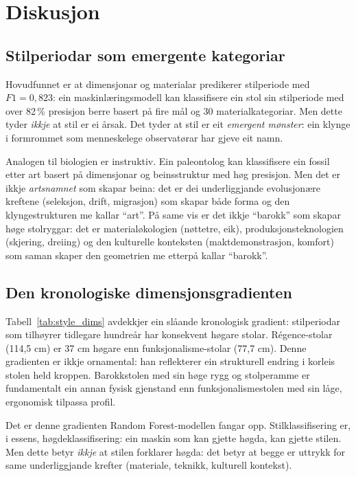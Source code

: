 \documentclass[10pt, a4paper, twocolumn]{article}
\begin{document}
\section{Diskusjon}

\subsection{Stilperiodar som emergente kategoriar}

Hovudfunnet er at dimensjonar og materialar predikerer stilperiode med $F1 = 0{,}823$: ein maskinlæringsmodell kan klassifisere ein stol sin stilperiode med over 82\,\% presisjon berre basert på fire mål og 30 materialkategoriar. Men dette tyder \emph{ikkje} at stil er ei årsak. Det tyder at stil er eit \emph{emergent mønster}: ein klynge i formrommet som menneskelege observatørar har gjeve eit namn.

Analogen til biologien er instruktiv. Ein paleontolog kan klassifisere ein fossil etter art basert på dimensjonar og beinsstruktur med høg presisjon. Men det er ikkje \emph{artsnamnet} som skapar beina: det er dei underliggjande evolusjonære kreftene (seleksjon, drift, migrasjon) som skapar både forma og den klyngestrukturen me kallar ``art''. På same vis er det ikkje ``barokk'' som skapar høge stolryggar: det er materialøkologien (nøttetre, eik), produksjonsteknologien (skjering, dreiing) og den kulturelle konteksten (maktdemonstrasjon, komfort) som saman skaper den geometrien me etterpå kallar ``barokk''.

\subsection{Den kronologiske dimensjonsgradienten}

Tabell~\ref{tab:style_dims} avdekkjer ein slåande kronologisk gradient: stilperiodar som tilhøyrer tidlegare hundreår har konsekvent høgare stolar. Régence-stolar (114,5 cm) er 37 cm høgare enn funksjonalisme-stolar (77,7 cm). Denne gradienten er ikkje ornamental: han reflekterer ein strukturell endring i korleis stolen held kroppen. Barokkstolen med sin høge rygg og stolperamme er fundamentalt ein annan fysisk gjenstand enn funksjonalismestolen med sin låge, ergonomisk tilpassa profil.

Det er denne gradienten Random Forest-modellen fangar opp. Stilklassifisering er, i essens, høgdeklassifisering: ein maskin som kan gjette høgda, kan gjette stilen. Men dette betyr \emph{ikkje} at stilen forklarer høgda: det betyr at begge er uttrykk for same underliggjande krefter (materiale, teknikk, kulturell kontekst).
\end{document}

